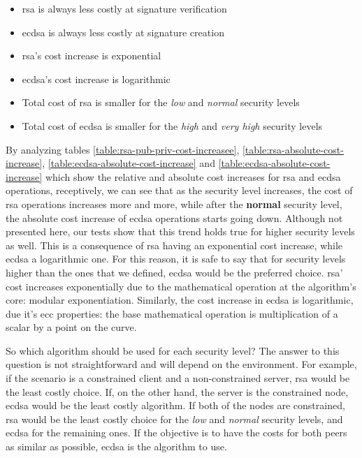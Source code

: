 \documentclass{llncs}
\begin{document}
\begin{itemize}
  \item \gls{rsa} is always less costly at signature verification
  \item \gls{ecdsa} is always less costly at signature creation
  \item \gls{rsa}'s cost increase is exponential
  \item \gls{ecdsa}'s cost increase is logarithmic
  \item Total cost of \gls{rsa} is smaller for the \textit{low} and \textit{normal} security levels
  \item Total cost of \gls{ecdsa} is smaller for the \textit{high} and \textit{very high} security levels
\end{itemize}

By analyzing tables \ref{table:rsa-pub-priv-cost-increasee}, \ref{table:rsa-absolute-cost-increase}, \ref{table:ecdsa-absolute-cost-increase} and
\ref{table:ecdsa-absolute-cost-increase} which show the relative and absolute cost increases for \gls{rsa} and \gls{ecdsa} operations, receptively,
we can see that as the security level increases, the cost of \gls{rsa} operations increases more and more, while after the \textbf{normal} security
level, the absolute cost increase of \gls{ecdsa} operations starts going down. Although not presented here, our tests show that this trend holds true
for higher security levels as well. This is a consequence of \gls{rsa} having an exponential cost increase, while \gls{ecdsa} a logarithmic one.
For this reason, it is safe to say that for security levels higher than the ones that we defined, \gls{ecdsa} would be the preferred choice.
\gls{rsa}' cost increases exponentially due to the mathematical operation at the algorithm's core: modular exponentiation. Similarly, the cost
increase in \gls{ecdsa} is logarithmic, due it's \gls{ecc} properties: the base mathematical operation is multiplication of a scalar by a point on the
curve.

So which algorithm should be used for each security level? The answer to this question is not straightforward and will depend on the environment.
For example, if the scenario is a constrained client and a non-constrained server, \gls{rsa} would be the least costly choice. If, on the
other hand, the server is the constrained node, \gls{ecdsa} would be the least costly algorithm. If both of the nodes are
constrained, \gls{rsa} would be the least costly choice for the \textit{low} and \textit{normal} security levels, and \gls{ecdsa} for the remaining ones.
If the objective is  to have the costs for both peers as similar as possible, \gls{ecdsa} is the algorithm to use.
\end{document}
